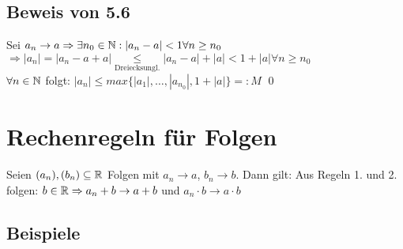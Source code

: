 \subsection*{Beweis von 5.6}
Sei $a_n \to a \Rightarrow \exists n_0 \in \mathbb{N}: |a_n-a|<1 \forall n \ge n_0$\\
$\Rightarrow |a_n| = |a_n-a+a| \underset{\text{Dreiecksungl.}}{\le} |a_n-a|+|a| < 1+|a| \forall n \ge n_0$\\
$\forall n \in \mathbb{N}$ folgt: $|a_n| \le max\{|a_1|,\hdots,|a_{n_0}|,1+|a|\} =: M$ \qed

\newpage

\section{Rechenregeln für Folgen}\label{5.7}
Seien $(a_n), (b_n) \subseteq \mathbb{R}$ Folgen mit $a_n \to a$, $b_n \to b$. Dann gilt:
Aus Regeln 1. und 2. folgen: $b \in \mathbb{R} \Rightarrow a_n + b \to a+b$ und $a_n \cdot b \to a \cdot b$

\subsection*{Beispiele}
